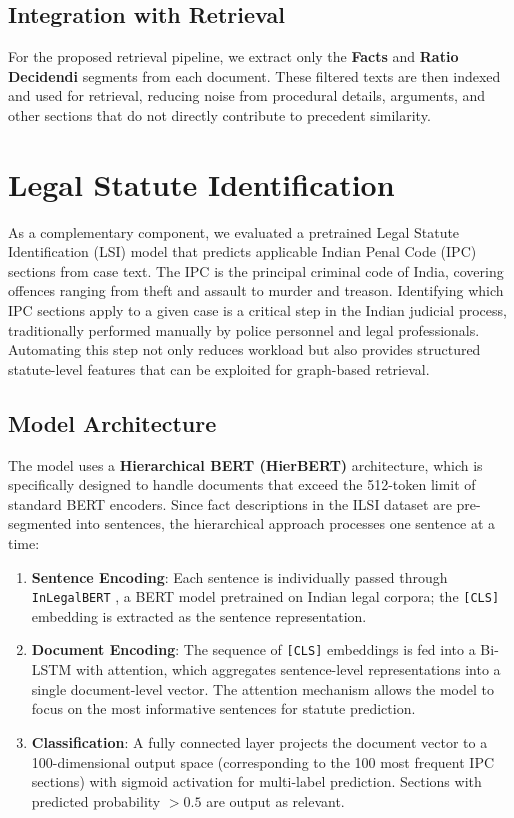 \documentclass[11pt]{article}
\begin{document}
\subsection{Integration with Retrieval}

For the proposed retrieval pipeline, we extract only the \textbf{Facts} and \textbf{Ratio Decidendi} segments from each document.
These filtered texts are then indexed and used for retrieval, reducing noise from procedural details, arguments, and other sections that do not directly contribute to precedent similarity.

\section{Legal Statute Identification}

As a complementary component, we evaluated a pretrained Legal Statute Identification (LSI) model that predicts applicable Indian Penal Code (IPC) sections from case text.
The IPC is the principal criminal code of India, covering offences ranging from theft and assault to murder and treason.
Identifying which IPC sections apply to a given case is a critical step in the Indian judicial process, traditionally performed manually by police personnel and legal professionals.
Automating this step not only reduces workload but also provides structured statute-level features that can be exploited for graph-based retrieval.

\subsection{Model Architecture}

The model uses a \textbf{Hierarchical BERT (HierBERT)} architecture, which is specifically designed to handle documents that exceed the 512-token limit of standard BERT encoders.
Since fact descriptions in the ILSI dataset are pre-segmented into sentences, the hierarchical approach processes one sentence at a time:
\begin{enumerate}
    \item \textbf{Sentence Encoding}: Each sentence is individually passed through \texttt{InLegalBERT} \cite{paul2022ilsi}, a BERT model pretrained on Indian legal corpora; the \texttt{[CLS]} embedding is extracted as the sentence representation.
    \item \textbf{Document Encoding}: The sequence of \texttt{[CLS]} embeddings is fed into a Bi-LSTM with attention, which aggregates sentence-level representations into a single document-level vector. The attention mechanism allows the model to focus on the most informative sentences for statute prediction.
    \item \textbf{Classification}: A fully connected layer projects the document vector to a 100-dimensional output space (corresponding to the 100 most frequent IPC sections) with sigmoid activation for multi-label prediction. Sections with predicted probability $> 0.5$ are output as relevant.
\end{enumerate}
\end{document}
